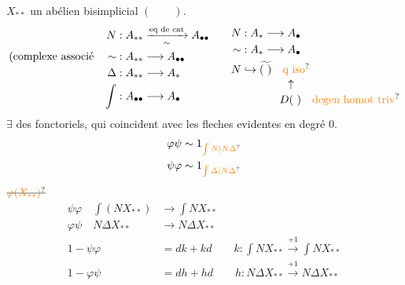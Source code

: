 \(X_{**}\) un  abélien bisimplicial \((\qquad)\).
\[
\begin{aligned}
N &: A_{**}\xrightarrow[\sim]{\text{eq de cat}} A_{\bullet\bullet}\\
\text{(complexe associé}\quad \sim &: A_{**}\longrightarrow A_{\bullet\bullet}\\
\Delta &: A_{**}\longrightarrow A_*\\
\int &: A_{\bullet\bullet}\longrightarrow A_\bullet
\end{aligned}
\qquad
\begin{aligned}
N &: A_*\longrightarrow A_\bullet\\
\sim &: A_*\longrightarrow A_\bullet\\
N&\hookrightarrow \widetilde{(\ )}\quad\unsure{\text{q iso}}\\[-2pt]
&\hspace{4em}\uparrow\\[-2pt]
&\hspace{3.5em}D(\ )\quad\unsure{\text{degen homot triv}}
\end{aligned}
\]
\(\exists\) des  fonctoriels,
 qui coincident avec les fleches evidentes en degré 0.
\[
\begin{aligned}
\varphi\psi&\sim1_{\unsure{\int N|N\Delta}}\\
\psi\varphi&\sim1_{\unsure{\int\Delta|N\Delta}}
\end{aligned}
\]
\(\deleted{\unsure{\varphi(X_{**})}}\)
\[
\begin{aligned}
\psi\varphi\quad\int (NX_{**})&\longrightarrow\int NX_{**}\\
\varphi\psi\quad N\Delta X_{**}&\longrightarrow N\Delta X_{**}\\
1-\psi\varphi&=dk+kd\qquad k:\int NX_{**}\xrightarrow{+1}\int NX_{**}\\
1-\varphi\psi&=dh+hd\qquad h:N\Delta X_{**}\xrightarrow{+1}N\Delta X_{**}
\end{aligned}
\]

